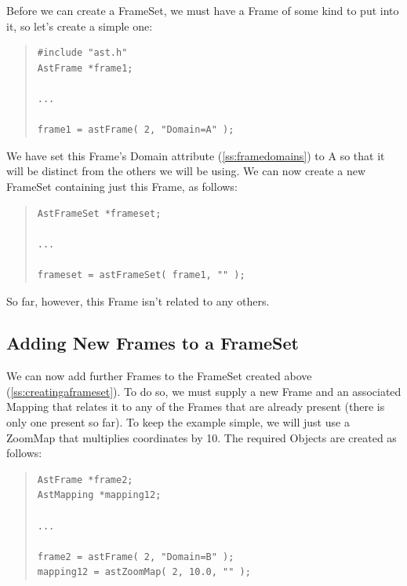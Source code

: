 \documentclass[twoside,11pt]{article}
\newcommand{\htmlref}[2]{#1}
\newcommand{\secref}[1]{\S\ref{#1}}
\renewcommand{\secref}[1]{\ref{#1}}
\begin{document}
Before we can create a \htmlref{FrameSet}{FrameSet}, we must have a \htmlref{Frame}{Frame} of some kind to
put into it, so let's create a simple one:

\begin{quote}
\small
\begin{verbatim}
#include "ast.h"
AstFrame *frame1;

...

frame1 = astFrame( 2, "Domain=A" );
\end{verbatim}
\normalsize
\end{quote}

We have set this Frame's \htmlref{Domain}{Domain} attribute (\secref{ss:framedomains}) to
A so that it will be distinct from the others we will be using. We can
now create a new FrameSet containing just this Frame, as follows:

\begin{quote}
\small
\begin{verbatim}
AstFrameSet *frameset;

...

frameset = astFrameSet( frame1, "" );
\end{verbatim}
\normalsize
\end{quote}

So far, however, this Frame isn't related to any others.

\subsection{\label{ss:addingframes}Adding New Frames to a FrameSet}

We can now add further Frames to the \htmlref{FrameSet}{FrameSet} created above
(\secref{ss:creatingaframeset}). To do so, we must supply a new \htmlref{Frame}{Frame}
and an associated \htmlref{Mapping}{Mapping} that relates it to any of the Frames that
are already present (there is only one present so far).  To keep the
example simple, we will just use a \htmlref{ZoomMap}{ZoomMap} that multiplies coordinates
by 10. The required Objects are created as follows:

\begin{quote}
\small
\begin{verbatim}
AstFrame *frame2;
AstMapping *mapping12;

...

frame2 = astFrame( 2, "Domain=B" );
mapping12 = astZoomMap( 2, 10.0, "" );
\end{verbatim}
\normalsize
\end{quote}
\end{document}
